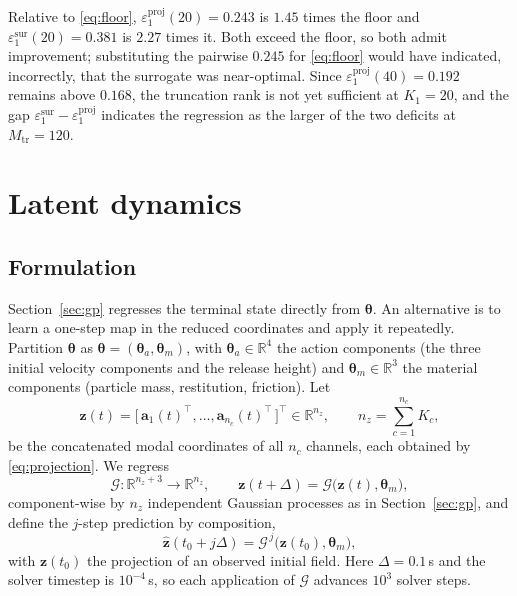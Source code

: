 \documentclass[11pt]{article}
\newcommand{\R}{\mathbb{R}}
\newcommand{\bs}[1]{\boldsymbol{#1}}
\begin{document}
Relative to \eqref{eq:floor}, $\varepsilon^{\text{proj}}_1(20) = 0.243$ is $1.45$ times the
floor and $\varepsilon^{\text{sur}}_1(20) = 0.381$ is $2.27$ times it. Both exceed the floor,
so both admit improvement; substituting the pairwise $0.245$ for \eqref{eq:floor} would have
indicated, incorrectly, that the surrogate was near-optimal. Since
$\varepsilon^{\text{proj}}_1(40) = 0.192$ remains above $0.168$, the truncation rank is not
yet sufficient at $K_1 = 20$, and the gap
$\varepsilon^{\text{sur}}_1 - \varepsilon^{\text{proj}}_1$ indicates the regression as the
larger of the two deficits at $M_{\mathrm{tr}} = 120$.

\section{Latent dynamics}
\label{sec:dynamics}

\subsection{Formulation}

Section~\ref{sec:gp} regresses the terminal state directly from $\bs{\theta}$. An alternative is to
learn a one-step map in the reduced coordinates and apply it repeatedly. Partition $\bs{\theta}$ as
$\bs{\theta} = (\bs{\theta}_a, \bs{\theta}_m)$, with $\bs{\theta}_a \in \R^{4}$ the action
components (the three initial velocity components and the release height) and
$\bs{\theta}_m \in \R^{3}$ the material components (particle mass, restitution, friction). Let
\begin{equation}
  \bs{z}(t) = \big[\, \bs{a}_1(t)^{\top}, \ldots, \bs{a}_{n_c}(t)^{\top} \,\big]^{\top}
  \in \R^{n_z}, \qquad n_z = \sum_{c=1}^{n_c} K_c ,
  \label{eq:latent-state}
\end{equation}
be the concatenated modal coordinates of all $n_c$ channels, each obtained by
\eqref{eq:projection}. We regress
\begin{equation}
  \mathcal{G} : \R^{n_z + 3} \to \R^{n_z},
  \qquad
  \bs{z}(t + \Delta) = \mathcal{G}\big( \bs{z}(t), \bs{\theta}_m \big),
  \label{eq:step-map}
\end{equation}
component-wise by $n_z$ independent Gaussian processes as in Section~\ref{sec:gp}, and define the
$j$-step prediction by composition,
\begin{equation}
  \hat{\bs{z}}(t_0 + j\Delta) = \mathcal{G}^{\,j}\big( \bs{z}(t_0), \bs{\theta}_m \big),
  \label{eq:rollout}
\end{equation}
with $\bs{z}(t_0)$ the projection of an observed initial field. Here $\Delta = 0.1$\,s and the solver
timestep is $10^{-4}$\,s, so each application of $\mathcal{G}$ advances $10^{3}$ solver steps.
\end{document}

